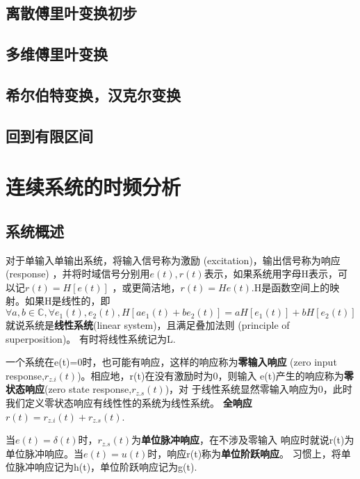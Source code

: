 \documentclass{ctexbook}
\begin{document}
\section{离散傅里叶变换初步}\label{sec:simple_DFT}

\section{多维傅里叶变换}\label{sec:Multi_Fourier}

\section{希尔伯特变换，汉克尔变换}\label{sec:Hilbert_Hankel}

\section{回到有限区间}\label{sec:Finite_Interval}

\chapter{连续系统的时频分析}%

\section{系统概述}
对于单输入单输出系统，将输入信号称为激励 (excitation)，输出信号称为响应 (response)
，并将时域信号分别用$e(t),r(t)$表示，如果系统用字母H表示，可以记$r(t)=H[e(t)]$
，或更简洁地，$r(t)=He(t)$.H是函数空间上的映射。如果H是线性的，即
\[\forall a,b\in\mathbb{C},\forall e_1(t),e_2(t),H[ae_1(t)+be_2(t)]=aH[e_1(t)]+bH[e_2(t)]\]
就说系统是\textbf{线性系统}(linear system)，且满足叠加法则 (principle of superposition)。
有时将线性系统记为L.

一个系统在e(t)=0时，也可能有响应，这样的响应称为\textbf{零输入响应}
(zero input response,$r_{z.i}(t)$)。相应地，r(t)在没有激励时为0，则输入
e(t)产生的响应称为\textbf{零状态响应}(zero state response,$r_{z.s}(t)$)，对
于线性系统显然零输入响应为0，此时我们定义零状态响应有线性性的系统为线性系统。
\textbf{全响应}$r(t)=r_{z.i}(t)+r_{z.s}(t)$.

当$e(t)=\delta(t)$时，$r_{z.s}(t)$为\textbf{单位脉冲响应}，在不涉及零输入
响应时就说r(t)为单位脉冲响应。当$e(t)=u(t)$时，响应r(t)称为\textbf{单位阶跃响应}。
习惯上，将单位脉冲响应记为h(t)，单位阶跃响应记为g(t).
\end{document}
